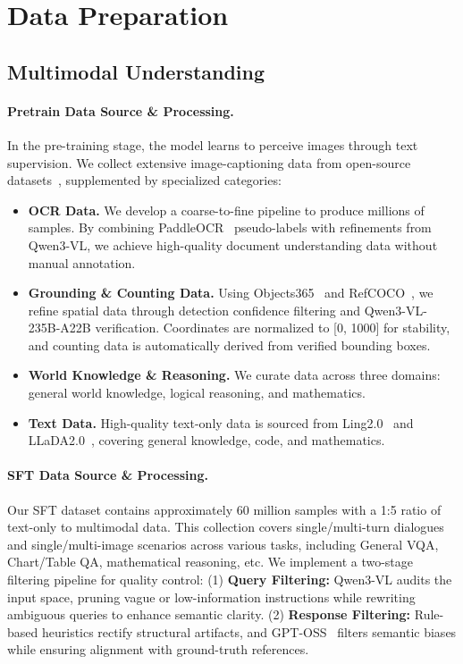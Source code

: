 \section{Data Preparation}
\subsection{Multimodal Understanding}
\paragraph{Pretrain Data Source \& Processing.} 
In the pre-training stage, the model learns to perceive images through text supervision.
%
We collect extensive image-captioning data from open-source datasets~\citep{LLaVA-OneVision-1.5,Penguin-VL}, supplemented by specialized categories:
%
\begin{itemize}[leftmargin=16pt]
    \item \textbf{OCR Data.} We develop a coarse-to-fine pipeline to produce millions of samples. By combining PaddleOCR~\citep{Paddleocr} pseudo-labels with refinements from Qwen3-VL, we achieve high-quality document understanding data without manual annotation.

    \item \textbf{Grounding \& Counting Data.} Using Objects365~\citep{Objects365} and RefCOCO~\citep{yu2016modeling,openimages,kazemzadeh2014referitgame}, we refine spatial data through detection confidence filtering and Qwen3-VL-235B-A22B \citep{team2025qwen3VL} verification. 
    Coordinates are normalized to [0, 1000] for stability, and counting data is automatically derived from verified bounding boxes.

    \item \textbf{World Knowledge \& Reasoning.} We curate data across three domains: general world knowledge, logical reasoning, and mathematics.

    \item \textbf{Text Data.} High-quality text-only data is sourced from Ling2.0~\citep{Ling2} and LLaDA2.0~\citep{LLaDA2}, covering general knowledge, code, and mathematics.
\end{itemize}

\paragraph{SFT Data Source \& Processing.} 
Our SFT dataset contains approximately 60 million samples with a 1:5 ratio of text-only to multimodal data.
%
This collection covers single/multi-turn dialogues and single/multi-image scenarios across various tasks, including General VQA, Chart/Table QA, mathematical reasoning, etc.
%
We implement a two-stage filtering pipeline for quality control:
(1) \textbf{Query Filtering:} Qwen3-VL audits the input space, pruning vague or low-information instructions while rewriting ambiguous queries to enhance semantic clarity.
%
(2) \textbf{Response Filtering:} Rule-based heuristics rectify structural artifacts, and GPT-OSS~\citep{agarwal2025gpt} filters semantic biases while ensuring alignment with ground-truth references.


